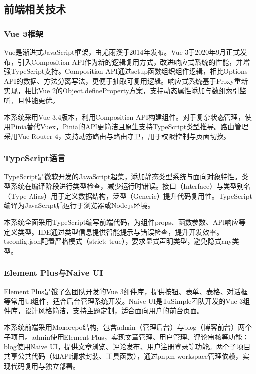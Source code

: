 \documentclass[UTF8,AutoFakeBold=1,AutoFakeSlant,zihao=-4]{SCAU}
\begin{document}
\subsection{前端相关技术}

\subsubsection{Vue 3框架}

Vue是渐进式JavaScript框架，由尤雨溪于2014年发布。Vue 3于2020年9月正式发布，引入Composition API作为新的逻辑复用方式，改进响应式系统的性能，并增强TypeScript支持。Composition API通过setup函数组织组件逻辑，相比Options API的数据、方法分离写法，更便于抽取可复用逻辑。响应式系统基于Proxy重新实现，相比Vue 2的Object.defineProperty方案，支持动态属性添加与数组索引监听，且性能更优。

本系统采用Vue 3.4版本，利用Composition API构建组件。对于复杂状态管理，使用Pinia替代Vuex，Pinia的API更简洁且原生支持TypeScript类型推导。路由管理采用Vue Router 4，支持动态路由与路由守卫，用于权限控制与页面切换。

\subsubsection{TypeScript语言}

TypeScript是微软开发的JavaScript超集，添加静态类型系统与面向对象特性。类型系统在编译阶段进行类型检查，减少运行时错误。接口（Interface）与类型别名（Type Alias）用于定义数据结构，泛型（Generic）提升代码复用性。TypeScript编译为JavaScript后运行于浏览器或Node.js环境。

本系统全面采用TypeScript编写前端代码，为组件props、函数参数、API响应等定义类型。IDE通过类型信息提供智能提示与错误检查，提升开发效率。tsconfig.json配置严格模式（strict: true），要求显式声明类型，避免隐式any类型。

\subsubsection{Element Plus与Naive UI}

Element Plus是饿了么团队开发的Vue 3组件库，提供按钮、表单、表格、对话框等常用UI组件，适合后台管理系统开发。Naive UI是TuSimple团队开发的Vue 3组件库，设计风格简洁，支持主题定制，适合面向用户的前台页面。

本系统前端采用Monorepo结构，包含admin（管理后台）与blog（博客前台）两个子项目。admin使用Element Plus，实现文章管理、用户管理、评论审核等功能；blog使用Naive UI，提供文章浏览、评论发布、用户注册登录等功能。两个子项目共享公共代码（如API请求封装、工具函数），通过pnpm workspace管理依赖，实现代码复用与独立部署。
\end{document}
